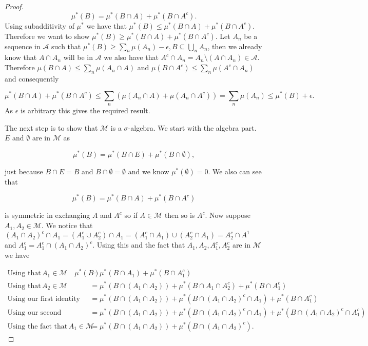 \documentclass[
]{book}
\theoremstyle{definition}
\theoremstyle{definition}
\theoremstyle{definition}
\theoremstyle{definition}
\theoremstyle{remark}
\begin{document}
\begin{proof}
\[ \mu^*(B) = \mu^*(B \cap A) + \mu^*(B \cap A^c). \]
Using subadditivity of \(\mu^*\) we have that \(\mu^*(B) \leq \mu^*(B \cap A) + \mu^*(B \cap A^c)\). Therefore we want to show \(\mu^*(B) \geq \mu^*(B \cap A) + \mu^*(B \cap A^c)\). Let \(A_n\) be a sequence in \(\mathcal{A}\) such that \(\mu^*(B) \geq \sum_n \mu(A_n) - \epsilon, B \subseteq \bigcup_n A_n\), then we already know that \(A \cap A_n\) will be in \(\mathcal{A}\) we also have that \(A^c \cap A_n = A_n \setminus (A \cap A_n) \in \mathcal{A}\). Therefore \(\mu(B \cap A) \leq \sum_n \mu(A_n \cap A)\) and \(\mu(B \cap A^c) \leq \sum_n \mu(A^c \cap A_n)\) and consequently

\[ \mu^*(B \cap A) + \mu^*(B \cap A^c) \leq \sum_n \left( \mu(A_n \cap A) + \mu(A_n \cap A^c) \right) = \sum_n \mu(A_n) \leq \mu^*(B) + \epsilon. \]
As \(\epsilon\) is arbitrary this gives the required result.

The next step is to show that \(\mathscr{M}\) is a \(\sigma\)-algebra. We start with the algebra part. \(E\) and \(\emptyset\) are in \(\mathscr{M}\) as

\[ \mu^*(B) = \mu^*(B \cap E) + \mu^*(B \cap \emptyset), \]

just because \(B \cap E = B\) and \(B \cap \emptyset = \emptyset\) and we know \(\mu^*(\emptyset) =0\). We also can see that

\[ \mu^*(B) = \mu^*(B \cap A) + \mu^*(B \cap A^c) \]

is symmetric in exchanging \(A\) and \(A^c\) so if \(A \in \mathscr{M}\) then so is \(A^c\). Now suppose \(A_1, A_2 \in \mathscr{M}\). We notice that \((A_1 \cap A_2)^c \cap A_1 = (A_1^c \cup A_2^c) \cap A_1 = (A_1^c \cap A_1) \cup (A_2^c \cap A_1) = A_2^c \cap A^1\) and \(A_1^c = A_1^c \cap(A_1 \cap A_2)^c\). Using this and the fact that \(A_1, A_2, A_1^c, A_2^c\) are in \(\mathscr{M}\) we have

\begin{align*}\mbox{Using that} \, A_1 \in \mathscr{M} \quad \mu^*(B) &= \mu^*(B \cap A_1) + \mu^*(B \cap A_1^c)\\
\mbox{Using that}\, A_2 \in \mathscr{M} \quad &= \mu^*(B \cap (A_1 \cap A_2)) + \mu^*(B \cap A_1 \cap A_2^c) + \mu^*(B \cap A_1^c)\\
\mbox{Using our first identity} \quad &= \mu^*(B \cap (A_1 \cap A_2)) + \mu^*(B \cap (A_1 \cap A_2)^c \cap A_1) + \mu^*(B \cap A_1^c)\\
\mbox{Using our second identiy} \quad &= \mu^*(B \cap (A_1 \cap A_2)) + \mu^*(B \cap (A_1 \cap A_2)^c \cap A_1) + \mu^*(B \cap (A_1 \cap A_2)^c \cap A_1^c)\\
\mbox{Using the fact that}\, A_1 \in \mathscr{M} \quad &= \mu^*(B \cap (A_1 \cap A_2)) + \mu^*(B \cap (A_1 \cap A_2)^c).
\end{align*}


\end{proof}
\end{document}
